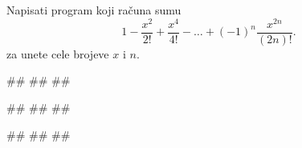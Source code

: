 \begin{Exercise}[difficulty=1, label=p1.razno6] 
Napisati program koji računa sumu
$$1 - \frac{x^{2}}{2!} + \frac{x^{4}}{4!} - \ldots +
(-1)^{n}\frac{x^{2n}}{(2n)!}.$$ za unete cele brojeve $x$ i $n$. 

\begin{minitest}
\begin{upotreba}{1}
#\naslovInt#
##
##
\end{upotreba}
\end{minitest}
\begin{minitest}
\begin{upotreba}{2}
#\naslovInt#
##
##
\end{upotreba}
\end{minitest}

\begin{minitest}
\begin{upotreba}{3}
#\naslovInt#
##
##
\end{upotreba}
\end{minitest}

\end{Exercise}
\begin{Answer}[ref=p1.razno6]
\end{Answer}


